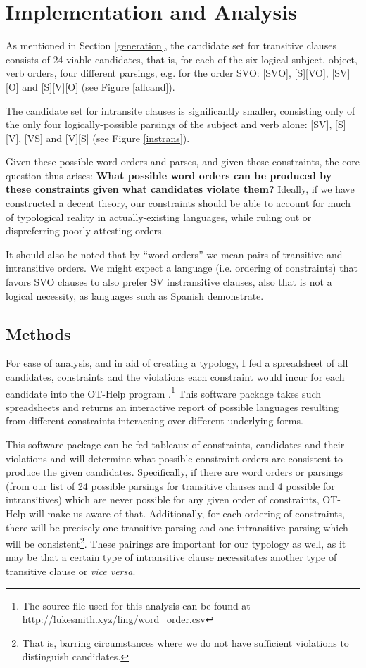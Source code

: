\documentclass{article}
\begin{document}
\section{Implementation and Analysis}


As mentioned in Section \ref{generation}, the candidate set for transitive clauses consists of 24 viable candidates, that is, for each of the six logical subject, object, verb orders, four different parsings, e.g. for the order SVO: [SVO], [S][VO], [SV][O] and [S][V][O] (see Figure \ref{allcand}).

The candidate set for intransite clauses is significantly smaller, consisting only of the only four logically-possible parsings of the subject and verb alone: [SV], [S][V], [VS] and [V][S] (see Figure \ref{instrans}).

Given these possible word orders and parses, and given these constraints, the core question thus arises: \textbf{What possible word orders  can be produced by these constraints given what candidates violate them?}
Ideally, if we have constructed a decent theory, our constraints should be able to account for much of typological reality in actually-existing languages, while ruling out or dispreferring poorly-attesting orders.

It should also be noted that by ``word orders'' we mean pairs of transitive and intransitive orders.
We might expect a language (i.e. ordering of constraints) that favors SVO clauses to also prefer SV instransitive clauses, also that is not a logical necessity, as languages such as Spanish demonstrate.

\subsection{Methods}

For ease of analysis, and in aid of creating a typology, I fed a spreadsheet of all candidates, constraints and the violations each constraint would incur for each candidate into the OT-Help program \parencite{othelp}.\footnote{The source file used for this analysis can be found at \href{http://lukesmith.xyz/ling/word_order.csv}{http://lukesmith.xyz/ling/word\_order.csv}} This software package takes such spreadsheets and returns an interactive report of possible languages resulting from different constraints interacting over different underlying forms.

This software package can be fed tableaux of constraints, candidates and their violations and will determine what possible constraint orders are consistent to produce the given candidates.
Specifically, if there are word orders or parsings (from our list of 24 possible parsings for transitive clauses and 4 possible for intransitives) which are never possible for any given order of constraints, OT-Help will make us aware of that.
Additionally, for each ordering of constraints, there will be precisely one transitive parsing and one intransitive parsing which will be consistent\footnote{That is, barring circumstances where we do not have sufficient violations to distinguish candidates.}.
These pairings are important for our typology as well, as it may be that a certain type of intransitive clause necessitates another type of transitive clause or \textit{vice versa}.
\end{document}
